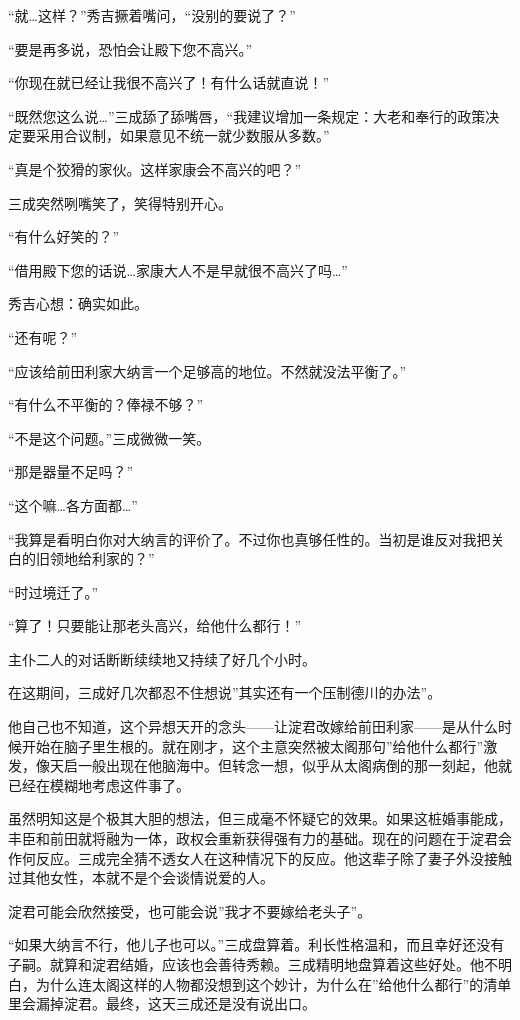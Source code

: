 \documentclass[
]{article}
\begin{document}
``就\ldots 这样？''秀吉撅着嘴问，``没别的要说了？''

``要是再多说，恐怕会让殿下您不高兴。''

``你现在就已经让我很不高兴了！有什么话就直说！''

``既然您这么说\ldots{}''三成舔了舔嘴唇，``我建议增加一条规定：大老和奉行的政策决定要采用合议制，如果意见不统一就少数服从多数。''

``真是个狡猾的家伙。这样家康会不高兴的吧？''

三成突然咧嘴笑了，笑得特别开心。

``有什么好笑的？''

``借用殿下您的话说\ldots 家康大人不是早就很不高兴了吗\ldots{}''

秀吉心想：确实如此。

``还有呢？''

``应该给前田利家大纳言一个足够高的地位。不然就没法平衡了。''

``有什么不平衡的？俸禄不够？''

``不是这个问题。''三成微微一笑。

``那是器量不足吗？''

``这个嘛\ldots 各方面都\ldots{}''

``我算是看明白你对大纳言的评价了。不过你也真够任性的。当初是谁反对我把关白的旧领地给利家的？''

``时过境迁了。''

``算了！只要能让那老头高兴，给他什么都行！''

主仆二人的对话断断续续地又持续了好几个小时。

在这期间，三成好几次都忍不住想说''其实还有一个压制德川的办法''。

他自己也不知道，这个异想天开的念头------让淀君改嫁给前田利家------是从什么时候开始在脑子里生根的。就在刚才，这个主意突然被太阁那句''给他什么都行''激发，像天启一般出现在他脑海中。但转念一想，似乎从太阁病倒的那一刻起，他就已经在模糊地考虑这件事了。

虽然明知这是个极其大胆的想法，但三成毫不怀疑它的效果。如果这桩婚事能成，丰臣和前田就将融为一体，政权会重新获得强有力的基础。现在的问题在于淀君会作何反应。三成完全猜不透女人在这种情况下的反应。他这辈子除了妻子外没接触过其他女性，本就不是个会谈情说爱的人。

淀君可能会欣然接受，也可能会说''我才不要嫁给老头子''。

``如果大纳言不行，他儿子也可以。''三成盘算着。利长性格温和，而且幸好还没有子嗣。就算和淀君结婚，应该也会善待秀赖。三成精明地盘算着这些好处。他不明白，为什么连太阁这样的人物都没想到这个妙计，为什么在''给他什么都行''的清单里会漏掉淀君。最终，这天三成还是没有说出口。
\end{document}
